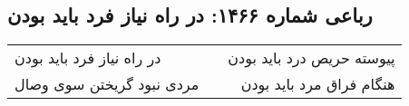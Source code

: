 \begin{center}
\section*{رباعی شماره ۱۴۶۶: در راه نیاز فرد باید بودن}
\label{sec:1466}
\begin{longtable}{l p{0.5cm} r}
در راه نیاز فرد باید بودن
&&
پیوسته حریص درد باید بودن
\\
مردی نبود گریختن سوی وصال
&&
هنگام فراق مرد باید بودن
\\
\end{longtable}
\end{center}
